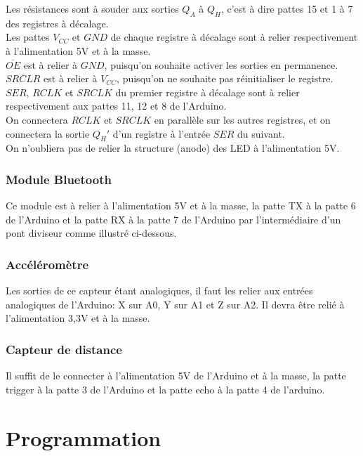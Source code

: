 \documentclass{article}
\begin{document}
Les résistances sont à souder aux sorties $Q_A$ à $Q_H$, c'est à dire pattes 15 et 1 à 7 des registres à décalage.\\
Les pattes $V_{CC}$ et $GND$ de chaque registre à décalage sont à relier respectivement à l'alimentation 5V et à la masse.\\
$\overline{OE}$ est à relier à $GND$, puisqu'on souhaite activer les sorties en permanence. $\overline{SRCLR}$ est à relier à $V_{CC}$, puisqu'on ne souhaite pas réinitialiser le registre.\\
$SER$, $RCLK$ et $SRCLK$ du premier registre à décalage sont à relier respectivement aux pattes 11, 12 et 8 de l'Arduino.\\
On connectera $RCLK$ et $SRCLK$ en parallèle sur les autres registres, et on connectera la sortie $Q_H'$ d'un registre à l'entrée $SER$ du suivant.\\
On n'oubliera pas de relier la structure (anode) des LED à l'alimentation 5V.\\



\subsubsection{Module Bluetooth}
Ce module est à relier à l'alimentation 5V et à la masse, la patte TX à la patte 6 de l'Arduino et la patte RX à la patte 7 de l'Arduino par l'intermédiaire d'un pont diviseur comme illustré ci-dessous.\\



\subsubsection{Accéléromètre}
Les sorties de ce capteur étant analogiques, il faut les relier aux entrées analogiques de l'Arduino: X sur A0, Y sur A1 et Z sur A2. Il devra être relié à l'alimentation 3,3V et à la masse.

\subsubsection{Capteur de distance}
Il suffit de le connecter à l'alimentation 5V de l'Arduino et à la masse, la patte trigger à la patte 3 de l'Arduino et la patte echo à la patte 4 de l'arduino.

\section{Programmation}
\end{document}
